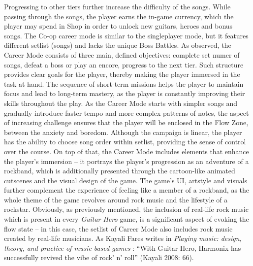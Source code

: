 Progressing to other tiers further increase the difficulty of the songs. While passing through the songs, the player earns the in-game currency, which the player may spend in Shop in order to unlock new guitars, heroes and bonus songs. The Co-op career mode is similar to the singleplayer mode, but it features different setlist (songs) and lacks the unique Boss Battles. As observed, the Career Mode consists of three main, defined objectives: complete set numer of songs, defeat a boss or play an encore, progress to the next tier. Such structure provides clear goals for the player, thereby making the player immersed in the task at hand. The sequence of short-term missions helps the player to maintain focus and lead to long-term mastery, as the player is constantly improving their skills throughout the play. As the Career Mode starts with simpler songs and gradually introduce faster tempo and more complex patterns of notes, the aspect of increasing challenge ensures that the player will be enclosed in the Flow Zone, between the anxiety and boredom. Although the campaign is linear, the player has the ability to choose song order within setlist, providing the sense of control over the course. On top of that, the Career Mode includes elements that enhance the player’s immersion -- it portrays the player’s progression as an adventure of a rockband, which is additionally presented through the cartoon-like animated cutscenes and the visual design of the game. The game’s UI, artstyle and visuals further complement the experience of feeling like a member of a rockband, as the whole theme of the game revolves around rock music and the lifestyle of a rockstar. Obviously, as previously mentioned, the inclusion of real-life rock music which is present in every \textit{Guitar Hero} game, is a significant aspect of evoking the flow state -- in this case, the setlist of Career Mode also includes rock music created by real-life musicians. As Kayali Fares writes in \textit{Playing music: design, theory, and practice of music-based games} \cite{faresplayingmusic}: “With Guitar Hero, Harmonix has successfully revived the vibe of rock’ n’ roll” (Kayali 2008: 66).

